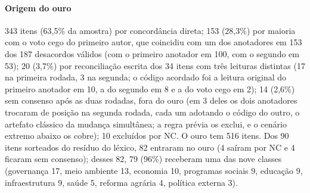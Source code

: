 \documentclass[fleqn,10pt]{SelfArx}
\begin{document}
\paragraph{Origem do ouro} 343 itens (63,5\% da amostra) por concordância direta; 153 (28,3\%) por maioria com o voto cego do primeiro autor, que coincidiu com um dos anotadores em 153 dos 187 desacordos válidos (com o primeiro anotador em 100, com o segundo em 53); 20 (3,7\%) por reconciliação escrita dos 34 itens com três leituras distintas (17 na primeira rodada, 3 na segunda; o código acordado foi a leitura original do primeiro anotador em 10, a do segundo em 8 e a do voto cego em 2); 14 (2,6\%) sem consenso após as duas rodadas, fora do ouro (em 3 deles os dois anotadores trocaram de posição na segunda rodada, cada um adotando o código do outro, o artefato clássico da mudança simultânea; a regra prévia os exclui, e o cenário extremo abaixo os cobre); 10 excluídos por NC. O ouro tem 516 itens. Dos 90 itens sorteados do resíduo do léxico, 82 entraram no ouro (4 saíram por NC e 4 ficaram sem consenso); desses 82, 79 (96\%) receberam uma das nove classes (governança 17, meio ambiente 13, economia 10, programas sociais 9, educação 9, infraestrutura 9, saúde 5, reforma agrária 4, política externa 3).
\end{document}
